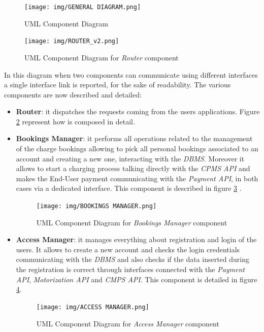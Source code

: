 \documentclass[a4paper]{report}
\begin{document}
\begin{figure}[hp]
\centering
\texttt{[image: img/GENERAL DIAGRAM.png]}
\caption{UML Component Diagram}
\label{fig:general-component-diagram}
\end{figure}


\begin{figure}[hp]
\centering
\texttt{[image: img/ROUTER\_v2.png]}
\caption{UML Component Diagram for \textit{Router} component}
\label{fig:router-component}
\end{figure}

In this diagram when two components can communicate using different interfaces a single interface link is
reported, for the sake of readability. The various components are now described and detailed:
\begin{itemize}
\item \textbf{Router}: it dispatches the requests coming from the users applications. Figure \ref{fig:router-component} represent how is composed in detail.

\item \textbf{Bookings Manager}: it performs all operations related to the management of the charge bookings allowing to pick all personal bookings associated to an account and creating a new one,  interacting with the \textit{DBMS}. Moreover it allows to start a charging process talking directly with the \textit{CPMS API} and makes the End-User payment communicating with the \textit{Payment API}, in both cases via a dedicated interface. This component is described in figure \ref{fig:bookingsmgr-component} .


\begin{figure}[htp]
\texttt{[image: img/BOOKINGS MANAGER.png]}
\caption{UML Component Diagram for \textit{Bookings Manager} component}
\label{fig:bookingsmgr-component}
\end{figure}

\item \textbf{Access Manager}: it manages everything about registration and login of the users. It allows to create a new account and checks the login credentials communicating with the \textit{DBMS} and also checks if the data inserted during the registration is correct through interfaces connected with the \textit{Payment API}, \textit{Motorization API} and \textit{CMPS API}. This component is detailed in figure \ref{fig:accessmgr-component}.

\begin{figure}[htp]
\centering
\texttt{[image: img/ACCESS MANAGER.png]}
\caption{UML Component Diagram for \textit{Access Manager} component}
\label{fig:accessmgr-component}
\end{figure}


\end{itemize}
\end{document}
